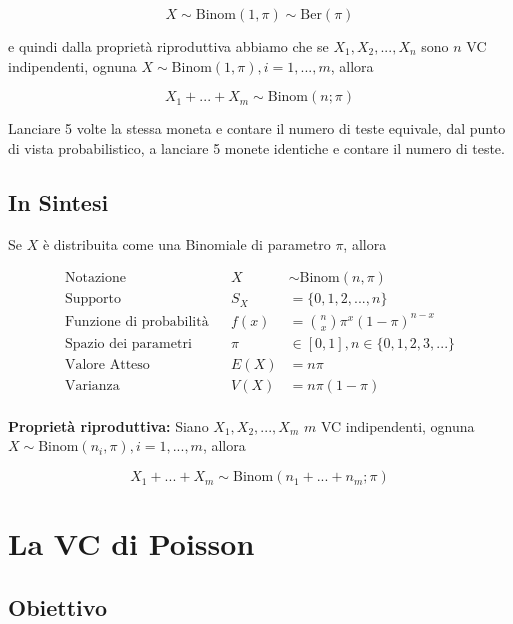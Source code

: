 \documentclass[
  11pt,
]{book}
\theoremstyle{mytheoremstyle}
\theoremstyle{mydefstyle}
\begin{document}
\[
X\sim\text{Binom}(1,\pi)\sim\text{Ber}(\pi)
\]

e quindi dalla proprietà riproduttiva abbiamo che se \(X_1,X_2,...,X_n\) sono \(n\) VC indipendenti, ognuna \(X\sim\text{Binom}(1,\pi), i =1,...,m\), allora

\[X_1+...+X_m\sim\text{Binom}(n;\pi)\]

Lanciare 5 volte la stessa moneta e contare il numero di teste equivale, dal punto di vista probabilistico, a lanciare 5 monete identiche e contare il numero di teste.

\clearpage

\subsection{In Sintesi}\label{in-sintesi-1}

\begin{info2}
Se \(X\) è distribuita come una Binomiale di parametro \(\pi\), allora

\begin{align*}
\text{Notazione} & & X&\sim\text{Binom}(n,\pi) \\
\text{Supporto} & & S_X &=\{0,1,2,...,n\} \\
\text{Funzione di probabilità} & & f(x)&=\binom{n}{x}\pi^x(1-\pi)^{n-x}\\
\text{Spazio dei parametri} & & \pi&\in[0,1], n\in\{0,1,2,3,...\}\\
\text{Valore Atteso} & & E(X)&=n\pi\\
\text{Varianza} & & V(X)&=n\pi(1-\pi)\\
\end{align*}

\textbf{Proprietà riproduttiva:}
Siano \(X_1,X_2,...,X_m\) \(m\) VC indipendenti, ognuna \(X\sim\text{Binom}(n_i,\pi), i =1,...,m\), allora

\[X_1+...+X_m\sim\text{Binom}(n_1+...+n_m;\pi)\]

\end{info2}

\newpage

\section{La VC di Poisson}\label{la-vc-di-poisson}

\subsection{Obiettivo}\label{obiettivo}
\end{document}

